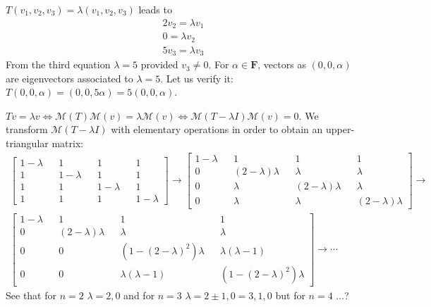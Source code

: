 \exo{} $T(v_1,v_2,v_3) = \lambda (v_1,v_2,v_3)$ leads to
\begin{align*}
2v_2 = \lambda v_1 \\
0 = \lambda v_2 \\
5v_3 = \lambda v_3
\end{align*}
From the third equation $\lambda=5$ provided $v_3\neq 0$. For $\alpha \in \mathbf{F}$, vectors as $(0,0,\alpha)$ are eigenvectors associated to $\lambda=5$. Let us verify it: $T(0,0,\alpha) = (0,0,5\alpha) = 5(0,0,\alpha)$.

\exo{} $Tv = \lambda v \iff \mathcal{M}(T)\mathcal{M}(v) = \lambda \mathcal{M}(v) \iff \mathcal{M}(T -\lambda I) \mathcal{M}(v) = 0$.
We transform $\mathcal{M}(T -\lambda I)$ with elementary operations in order to obtain an upper-triangular matrix: 
\begin{align*}
\begin{bmatrix}
1-\lambda && 1 && 1 && 1 \\
1 && 1-\lambda && 1 && 1 \\
1 && 1 && 1-\lambda && 1 \\
1 && 1 && 1 && 1-\lambda
\end{bmatrix} \to 
\begin{bmatrix}
1-\lambda && 1 && 1 && 1 \\
0 && (2-\lambda)\lambda && \lambda && \lambda \\
0 && \lambda && (2-\lambda)\lambda && \lambda \\
0 && \lambda && \lambda && (2-\lambda)\lambda
\end{bmatrix} \to  \\
\begin{bmatrix}
1-\lambda && 1 && 1 && 1 \\
0 && (2-\lambda)\lambda && \lambda && \lambda \\
0 && 0 && (1-(2-\lambda)^2)\lambda && \lambda(\lambda-1) \\
0 && 0 && \lambda(\lambda-1) && (1-(2-\lambda)^2)\lambda
\end{bmatrix} \to  \cdots
\end{align*}
See that for $n=2$ $\lambda = 2,0$ and for $n=3$ $\lambda = 2 \pm 1,0 = 3, 1,0$ but for $n=4$ ...?

